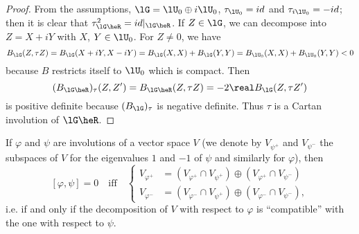 \begin{proof}
From the assumptions, $\lG=\lU_0\oplus i\lU_0$, $\tau_{\lU_0}=id$ and $\tau_{i\lU_0}=-id$; then it is clear that $\tau_{\lG\heR}^2=id|_{\lG\heR}$. If $Z\in\lG$, we can decompose into $Z=X+iY$ with $X$, $Y\in\lU_0$. For $Z\neq 0$, we have
\begin{equation}
    B_{\lG}(Z,\tau Z)=B_{\lG}(X+iY,X-iY)
                     =B_{\lG}(X,X)+B_{\lG}(Y,Y)
             =B_{\lU_0}(X,X)+B_{\lU_0}(Y,Y)<0
\end{equation}
because $B$ restricts itself to $\lU_0$ which is compact. Then
\begin{equation}
  (B_{\lG\heR})_{\tau}(Z,Z')=B_{\lG\heR}(Z,\tau Z)
                            =-2\real B_{\lG}(Z,\tau Z')
\end{equation}
is positive definite because $(B_{\lG})_{\tau}$ is negative definite. Thus $\tau$ is a Cartan involution of $\lG\heR$.
\end{proof}

\begin{lemma}
If $\varphi$ and $\psi$ are involutions of a vector space $V$ (we denote by $V_{\psi^+}$ and $V_{\psi^-}$ the subspaces of $V$ for the eigenvalues $1$ and $-1$ of $\psi$ and similarly for $\varphi$), then
\[
[\varphi,\psi]=0\quad\text{iff}\quad \left\{   \begin{aligned}
                                                   V_{\varphi^+}&=(V_{\varphi^+}\cap V_{\psi^+})\oplus(V_{\varphi^+}\cap V_{\psi^-})\\
                           V_{\varphi^-}&=(V_{\varphi^-}\cap V_{\psi^+})\oplus(V_{\varphi^-}\cap V_{\psi^-}),
                                           \end{aligned}
                      \right.
\]
i.e. if and only if the decomposition of $V$ with respect to $\varphi$ is ``compatible''{} with the one with respect to $\psi$.
\label{lem:invol_compat}
\end{lemma}


